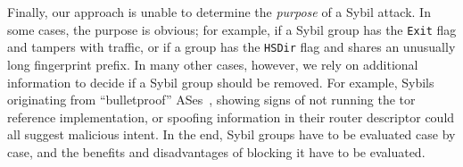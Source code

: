 Finally, our approach is unable to determine the \emph{purpose} of a Sybil
attack.  In some cases, the purpose is obvious; for example, if a Sybil group
has the \texttt{Exit} flag and tampers with traffic, or if a group has the
\texttt{HSDir} flag and shares an unusually long fingerprint prefix.  In many
other cases, however, we rely on additional information to decide if a Sybil
group should be removed.  For example, Sybils originating from ``bulletproof''
ASes~\cite{Konte2015a}, showing signs of not running the tor reference
implementation, or spoofing information in their router descriptor could all
suggest malicious intent.  In the end, Sybil groups have to be evaluated case
by case, and the benefits and disadvantages of blocking it have to be evaluated.
